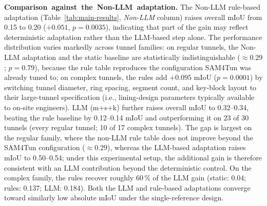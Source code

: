 \documentclass[a4paper,fleqn]{cas-dc}
\begin{document}
{\mbox{\textbf{Comparison against the Non-LLM adaptation.}} The Non-LLM rule-based adaptation (Table~\mbox{\ref{tab:main-results}}, \mbox{\emph{Non-LLM}} column) raises overall mIoU from 0.15 to 0.20 ($+0.051$, $p = 0.0035$), indicating that part of the gain may reflect deterministic adaptation rather than the LLM-based step alone. The performance distribution varies markedly across tunnel families: on regular tunnels, the Non-LLM adaptation and the static baseline are statistically indistinguishable ($\approx 0.29$; $p = 0.79$), because the rule table reproduces the configuration SAM4Tun was already tuned to; on complex tunnels, the rules add $+0.095$ mIoU ($p = 0.0001$) by switching tunnel diameter, ring spacing, segment count, and key-block layout to their large-tunnel specification (i.e., lining-design parameters typically available to on-site engineers). LLM (m+s+k) further raises overall mIoU to 0.32--0.34, beating the rule baseline by 0.12--0.14 mIoU and outperforming it on 23 of 30 tunnels (every regular tunnel; 10 of 17 complex tunnels). The gap is largest on the regular family, where the non-LLM rule table does not improve beyond the SAM4Tun configuration ($\approx 0.29$), whereas the LLM-based adaptation raises mIoU to 0.50--0.54; under this experimental setup, the additional gain is therefore consistent with an LLM contribution beyond the deterministic control. On the complex family, the rules recover roughly 60\,\% of the LLM gain (static: 0.04; rules: 0.137; LLM: 0.184). Both the LLM and rule-based adaptations converge toward similarly low absolute mIoU under the single-reference design.

}
\end{document}
